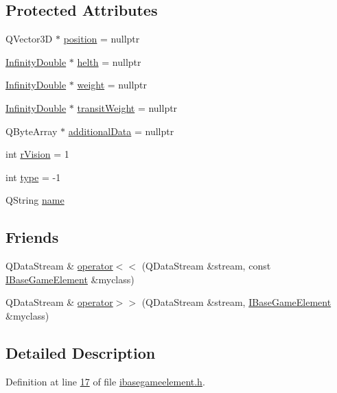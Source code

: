 \subsection*{Protected Attributes}
\begin{DoxyCompactItemize}
\item 
Q\+Vector3D $\ast$ \hyperlink{a00137_afe080b1942ec40832e94cb884ec87456}{position} = nullptr
\item 
\hyperlink{a00161}{Infinity\+Double} $\ast$ \hyperlink{a00137_a440cf9e7d61c33482ab256a6e944b34d}{helth} = nullptr
\item 
\hyperlink{a00161}{Infinity\+Double} $\ast$ \hyperlink{a00137_a99901016531fd27b9b197dc88d3bfa4a}{weight} = nullptr
\item 
\hyperlink{a00161}{Infinity\+Double} $\ast$ \hyperlink{a00137_a865c937433f7d46665ca17e5adccd9df}{transit\+Weight} = nullptr
\item 
Q\+Byte\+Array $\ast$ \hyperlink{a00137_a4d3547697d3bd0c2d65c83b07b3f8f91}{additional\+Data} = nullptr
\item 
int \hyperlink{a00137_ae0ad3c240950eba352aeb04e6a9296b4}{r\+Vision} = 1
\item 
int \hyperlink{a00137_a73a4ca23072b617f3d17004e3c671bca}{type} = -\/1
\item 
Q\+String \hyperlink{a00137_af35fba4ed599605c3d78b3c3a71fa467}{name}
\end{DoxyCompactItemize}
\subsection*{Friends}
\begin{DoxyCompactItemize}
\item 
Q\+Data\+Stream \& \hyperlink{a00137_a085503f71c16e737fb172c9cef329c2f}{operator$<$$<$} (Q\+Data\+Stream \&stream, const \hyperlink{a00137}{I\+Base\+Game\+Element} \&myclass)
\item 
Q\+Data\+Stream \& \hyperlink{a00137_aed5ed6630f457a8cc55c01a605067300}{operator$>$$>$} (Q\+Data\+Stream \&stream, \hyperlink{a00137}{I\+Base\+Game\+Element} \&myclass)
\end{DoxyCompactItemize}


\subsection{Detailed Description}


Definition at line \hyperlink{a00047_source_l00017}{17} of file \hyperlink{a00047_source}{ibasegameelement.\+h}.



